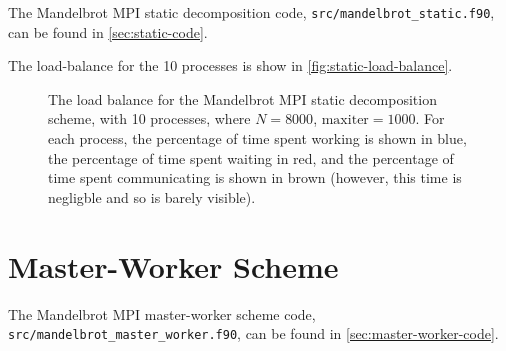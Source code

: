 \documentclass{article}
\begin{document}
The Mandelbrot MPI static decomposition code,
\lstinline[style=ff]{src/mandelbrot_static.f90}, can be found in
\autoref{sec:static-code}.



The load-balance for the 10 processes is show in
\autoref{fig:static-load-balance}.
\begin{figure}[h]
  \centering
  \caption{The load balance for the Mandelbrot MPI static decomposition scheme,
    with 10 processes, where $N = 8000$, $\mathrm{maxiter} = 1000$. For each
    process, the percentage of time spent working is shown in blue, the
    percentage of time spent waiting in red, and the percentage of time spent
    communicating is shown in brown (however, this time is negligble and so is
    barely visible).}
  \label{fig:static-load-balance}
\end{figure}

\newpage
\section{Master-Worker Scheme}
\label{sec:master-worker}

The Mandelbrot MPI master-worker scheme code,
\lstinline[style=ff]{src/mandelbrot_master_worker.f90}, can be
found in \autoref{sec:master-worker-code}.


\end{document}
